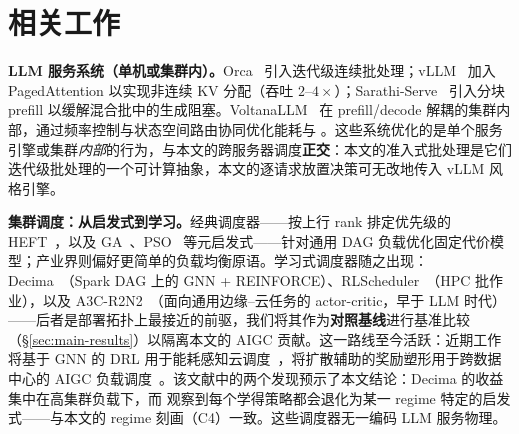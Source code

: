 \section{相关工作}
\label{sec:related}

\textbf{LLM 服务系统（单机或集群内）。}Orca~\cite{yu2022orca} 引入迭代级连续批处理；vLLM~\cite{kwon2023vllm} 加入 PagedAttention 以实现非连续 KV 分配（吞吐 $2$--$4\times$）；Sarathi-Serve~\cite{agrawal2024sarathi} 引入分块 prefill 以缓解混合批中的生成阻塞。VoltanaLLM~\cite{yu2025voltana} 在 prefill/decode 解耦的集群内部，通过频率控制与状态空间路由协同优化能耗与 \slo{}。这些系统优化的是单个服务引擎或集群\emph{内部}的行为，与本文的跨服务器调度\textbf{正交}：本文的准入式批处理是它们迭代级批处理的一个可计算抽象，本文的逐请求放置决策可无改地传入 vLLM 风格引擎。

\textbf{集群调度：从启发式到学习。}经典调度器——按上行 rank 排定优先级的 HEFT~\cite{topcuoglu2002heft}，以及 GA~\cite{holland1975adaptation}、PSO~\cite{kennedy1995pso} 等元启发式——针对通用 DAG 负载优化固定代价模型；产业界则偏好更简单的负载均衡原语。学习式调度器随之出现：Decima~\cite{mao2019decima}（Spark DAG 上的 GNN + REINFORCE）、RLScheduler~\cite{zhang2020rlscheduler}（HPC 批作业），以及 A3C-R2N2~\cite{tuli2022a3cr2n}（面向通用边缘--云任务的 actor-critic，早于 LLM 时代）——后者是部署拓扑上最接近的前驱，我们将其作为\textbf{对照基线}进行基准比较（\S\ref{sec:main-results}）以隔离本文的 AIGC 贡献。这一路线至今活跃：近期工作将基于 GNN 的 DRL 用于能耗感知云调度~\cite{dagtopology2026}，将扩散辅助的奖励塑形用于跨数据中心的 AIGC 负载调度~\cite{aigcenergy2026}。该文献中的两个发现预示了本文结论：Decima 的收益集中在高集群负载下，而 \cite{dagtopology2026} 观察到每个学得策略都会退化为某一 regime 特定的启发式——与本文的 regime 刻画（C4）一致。这些调度器无一编码 LLM 服务物理。

